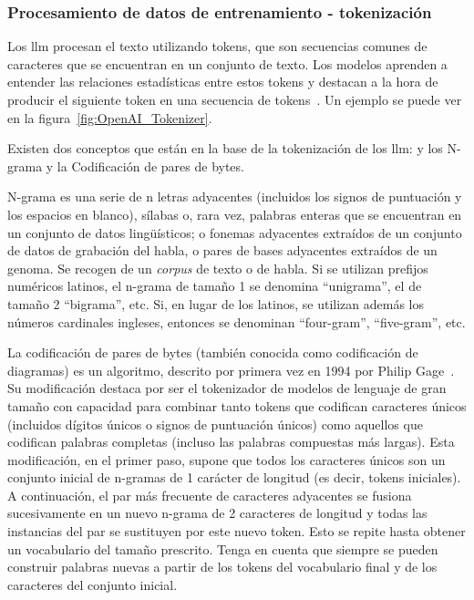 
\subsubsection{Procesamiento de datos de entrenamiento - tokenización}

Los \acrlong{llm} procesan el texto utilizando tokens, que son secuencias comunes de caracteres que se encuentran en un conjunto de texto. Los modelos aprenden a entender las relaciones estadísticas entre estos tokens y destacan a la hora de producir el siguiente token en una secuencia de tokens~\cite{OpenAI_Tokenizer}. Un ejemplo se puede ver en la figura~\ref{fig:OpenAI_Tokenizer}.


Existen dos conceptos que están en la base de la tokenización de los \acrshort{llm}: y los N-grama y la Codificación de pares de bytes.

N-grama es una serie de n letras adyacentes (incluidos los signos de puntuación y los espacios en blanco), sílabas o, rara vez, palabras enteras que se encuentran en un conjunto de datos lingüísticos; o fonemas adyacentes extraídos de un conjunto de datos de grabación del habla, o pares de bases adyacentes extraídos de un genoma. Se recogen de un \textit{corpus} de texto o de habla. Si se utilizan prefijos numéricos latinos, el n-grama de tamaño 1 se denomina ``unigrama'', el de tamaño 2 ``bigrama'', etc. Si, en lugar de los latinos, se utilizan además los números cardinales ingleses, entonces se denominan ``four-gram'', ``five-gram'', etc. 

La codificación de pares de bytes (también conocida como codificación de diagramas) es un algoritmo, descrito por primera vez en 1994 por Philip Gage~\cite{Gage_Compresion}. Su modificación destaca por ser el tokenizador de modelos de lenguaje de gran tamaño con capacidad para combinar tanto tokens que codifican caracteres únicos (incluidos dígitos únicos o signos de puntuación únicos) como aquellos que codifican palabras completas (incluso las palabras compuestas más largas). Esta modificación, en el primer paso, supone que todos los caracteres únicos son un conjunto inicial de n-gramas de 1 carácter de longitud (es decir, tokens iniciales). A continuación, el par más frecuente de caracteres adyacentes se fusiona sucesivamente en un nuevo n-grama de 2 caracteres de longitud y todas las instancias del par se sustituyen por este nuevo token. Esto se repite hasta obtener un vocabulario del tamaño prescrito. Tenga en cuenta que siempre se pueden construir palabras nuevas a partir de los tokens del vocabulario final y de los caracteres del conjunto inicial.

